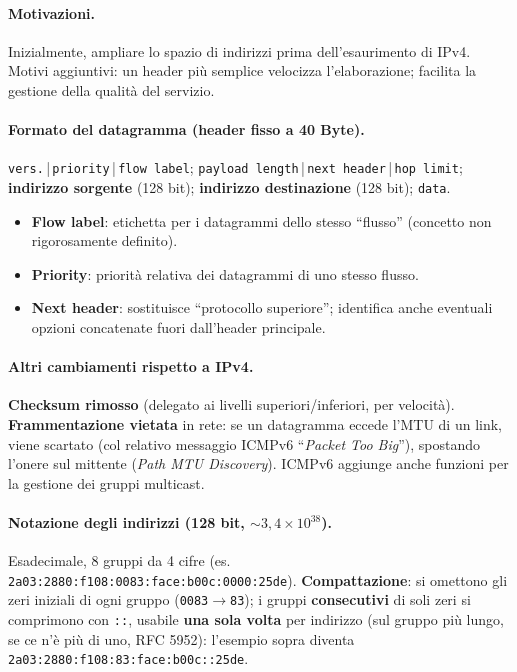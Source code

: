 \documentclass[12pt, a4paper]{article}
\begin{document}
\paragraph{Motivazioni.} Inizialmente, ampliare lo spazio di indirizzi prima dell'esaurimento di IPv4. Motivi aggiuntivi: un header più semplice velocizza l'elaborazione; facilita la gestione della qualità del servizio.

\paragraph{Formato del datagramma (header fisso a 40 Byte).}
\texttt{vers.}\,|\,\texttt{priority}\,|\,\texttt{flow label}; \texttt{payload length}\,|\,\texttt{next header}\,|\,\texttt{hop limit}; \textbf{indirizzo sorgente} (128 bit); \textbf{indirizzo destinazione} (128 bit); \texttt{data}.
\begin{itemize}
    \item \textbf{Flow label}: etichetta per i datagrammi dello stesso ``flusso'' (concetto non rigorosamente definito).
    \item \textbf{Priority}: priorità relativa dei datagrammi di uno stesso flusso.
    \item \textbf{Next header}: sostituisce ``protocollo superiore''; identifica anche eventuali opzioni concatenate fuori dall'header principale.
\end{itemize}

\paragraph{Altri cambiamenti rispetto a IPv4.} \textbf{Checksum rimosso} (delegato ai livelli superiori/inferiori, per velocità). \textbf{Frammentazione vietata} in rete: se un datagramma eccede l'MTU di un link, viene scartato (col relativo messaggio ICMPv6 ``\textit{Packet Too Big}''), spostando l'onere sul mittente (\textit{Path MTU Discovery}). ICMPv6 aggiunge anche funzioni per la gestione dei gruppi multicast.

\paragraph{Notazione degli indirizzi (128 bit, $\sim 3{,}4\times10^{38}$).} Esadecimale, 8 gruppi da 4 cifre (es. \texttt{2a03:2880:f108:0083:face:b00c:0000:25de}). \textbf{Compattazione}: si omettono gli zeri iniziali di ogni gruppo (\texttt{0083}$\to$\texttt{83}); i gruppi \textbf{consecutivi} di soli zeri si comprimono con \texttt{::}, usabile \textbf{una sola volta} per indirizzo (sul gruppo più lungo, se ce n'è più di uno, RFC 5952): l'esempio sopra diventa \texttt{2a03:2880:f108:83:face:b00c::25de}.
\end{document}
